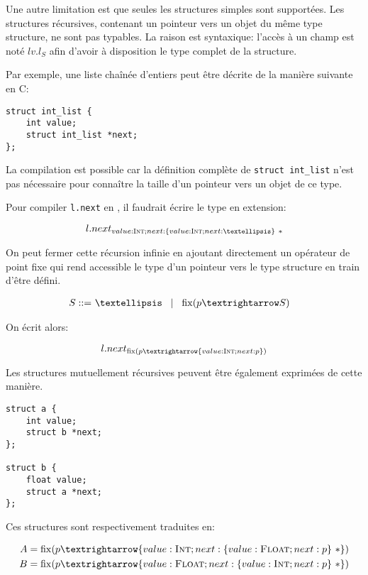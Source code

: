 Une autre limitation est que seules les structures simples sont supportées. Les
structures récursives, contenant un pointeur vers un objet du même type
structure, ne sont pas typables. La raison est syntaxique: l'accès à un champ
est noté $lv.l_S$ afin d'avoir à disposition le type complet de la structure.


Par exemple, une liste chaînée d'entiers peut être décrite de la manière
suivante en C:\@

\begin{verbatim}
struct int_list {
    int value;
    struct int_list *next;
};
\end{verbatim}


La compilation est possible car la définition complète de \texttt{struct
int\_list} n'est pas nécessaire pour connaître la taille d'un pointeur vers un
objet de ce type.

Pour compiler \texttt{l.next} en \langname, il faudrait écrire le type en
extension:

\[
  l.next_{ value:\tInt ; next : \{ value : \tInt ; next : … \}~*}
\]

On peut fermer cette récursion infinie en ajoutant directement un opérateur de
point fixe qui rend accessible le type d'un pointeur vers le type structure en
train d'être défini.

\begin{align*}
    S \gramisa & … \gramorx \mathrm{fix}(p → S)
\end{align*}

On écrit alors:

\[
  l.next_{ \mathrm{fix}(p → \{ value : \tInt ; next : p \}) }
\]

Les structures mutuellement récursives peuvent être également exprimées de cette
manière.

\begin{verbatim}
struct a {
    int value;
    struct b *next;
};

struct b {
    float value;
    struct a *next;
};
\end{verbatim}

Ces structures sont respectivement traduites en:

\begin{align*}
  A &= \mathrm{fix} (p → \{ value : \tInt   ; next : \{ value : \tFloat ; next : p \}~* \}) \\
  B &= \mathrm{fix} (p → \{ value : \tFloat ; next : \{ value : \tInt   ; next : p \}~* \})
\end{align*}

